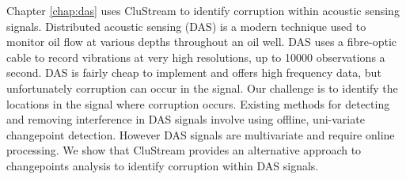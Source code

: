 


Chapter \ref{chap:das} uses CluStream to identify corruption within acoustic sensing signals.  Distributed acoustic sensing (DAS) is a modern technique used to monitor oil flow at various depths throughout an oil  well. DAS uses a fibre-optic cable to record vibrations at very high resolutions, up to 10000 observations a second.  DAS is fairly cheap to implement and offers high frequency data, but unfortunately corruption can occur in the signal.  Our challenge is to identify the locations in the signal where corruption occurs. Existing methods for detecting and removing interference in DAS signals involve using offline, uni-variate changepoint detection. However DAS signals are multivariate and require online processing. We show that CluStream provides an alternative approach to changepoints analysis to identify corruption within DAS signals.


